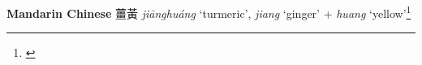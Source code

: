 \begin{etymology}\label{ety:jianghuang}
\textbf{Mandarin Chinese} {薑黃} \textit{jiānghuáng} `turmeric', \textit{jiang} `ginger' + \textit{huang} `yellow'\footnote{\textcite[856]{kleeman_oxford_2010}}
\end{etymology}